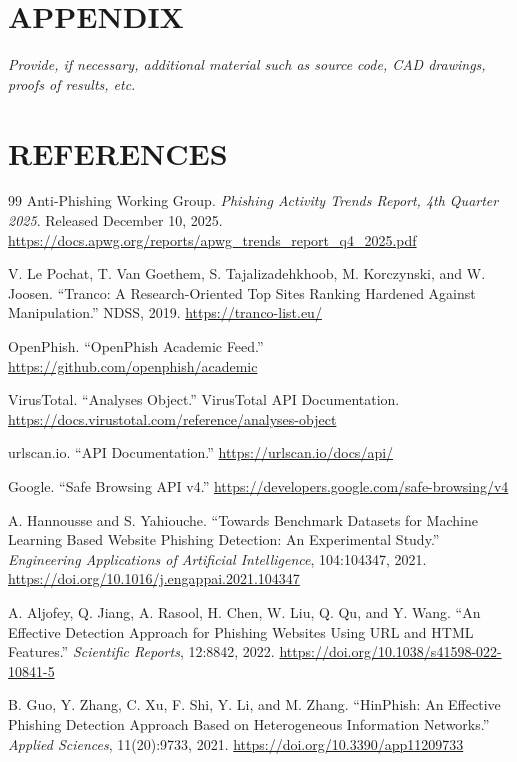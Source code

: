 \documentclass[12pt,letterpaper]{article}
\begin{document}
\section{APPENDIX}
\textit{Provide, if necessary, additional material such as source code, CAD drawings, proofs of results, etc.}

\section{REFERENCES}
\renewcommand{\refname}{}
\begin{thebibliography}{99}
 Anti-Phishing Working Group. \textit{Phishing Activity Trends Report, 4th Quarter 2025}. Released December 10, 2025. \url{https://docs.apwg.org/reports/apwg_trends_report_q4_2025.pdf}

 V. Le Pochat, T. Van Goethem, S. Tajalizadehkhoob, M. Korczynski, and W. Joosen. ``Tranco: A Research-Oriented Top Sites Ranking Hardened Against Manipulation.'' NDSS, 2019. \url{https://tranco-list.eu/}

 OpenPhish. ``OpenPhish Academic Feed.'' \url{https://github.com/openphish/academic}

 VirusTotal. ``Analyses Object.'' VirusTotal API Documentation. \url{https://docs.virustotal.com/reference/analyses-object}

 urlscan.io. ``API Documentation.'' \url{https://urlscan.io/docs/api/}

 Google. ``Safe Browsing API v4.'' \url{https://developers.google.com/safe-browsing/v4}

 A. Hannousse and S. Yahiouche. ``Towards Benchmark Datasets for Machine Learning Based Website Phishing Detection: An Experimental Study.'' \textit{Engineering Applications of Artificial Intelligence}, 104:104347, 2021. \url{https://doi.org/10.1016/j.engappai.2021.104347}

 A. Aljofey, Q. Jiang, A. Rasool, H. Chen, W. Liu, Q. Qu, and Y. Wang. ``An Effective Detection Approach for Phishing Websites Using URL and HTML Features.'' \textit{Scientific Reports}, 12:8842, 2022. \url{https://doi.org/10.1038/s41598-022-10841-5}

 B. Guo, Y. Zhang, C. Xu, F. Shi, Y. Li, and M. Zhang. ``HinPhish: An Effective Phishing Detection Approach Based on Heterogeneous Information Networks.'' \textit{Applied Sciences}, 11(20):9733, 2021. \url{https://doi.org/10.3390/app11209733}


\end{thebibliography}
\end{document}
